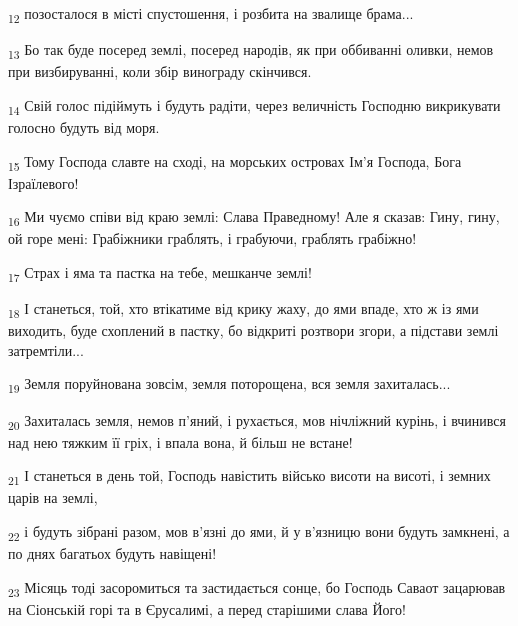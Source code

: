 \begin{tcolorbox}
\textsubscript{12} позосталося в місті спустошення, і розбита на звалище брама...
\end{tcolorbox}
\begin{tcolorbox}
\textsubscript{13} Бо так буде посеред землі, посеред народів, як при оббиванні оливки, немов при визбируванні, коли збір винограду скінчився.
\end{tcolorbox}
\begin{tcolorbox}
\textsubscript{14} Свій голос підіймуть і будуть радіти, через величність Господню викрикувати голосно будуть від моря.
\end{tcolorbox}
\begin{tcolorbox}
\textsubscript{15} Тому Господа славте на сході, на морських островах Ім'я Господа, Бога Ізраїлевого!
\end{tcolorbox}
\begin{tcolorbox}
\textsubscript{16} Ми чуємо співи від краю землі: Слава Праведному! Але я сказав: Гину, гину, ой горе мені: Грабіжники граблять, і грабуючи, граблять грабіжно!
\end{tcolorbox}
\begin{tcolorbox}
\textsubscript{17} Страх і яма та пастка на тебе, мешканче землі!
\end{tcolorbox}
\begin{tcolorbox}
\textsubscript{18} І станеться, той, хто втікатиме від крику жаху, до ями впаде, хто ж із ями виходить, буде схоплений в пастку, бо відкриті розтвори згори, а підстави землі затремтіли...
\end{tcolorbox}
\begin{tcolorbox}
\textsubscript{19} Земля поруйнована зовсім, земля поторощена, вся земля захиталась...
\end{tcolorbox}
\begin{tcolorbox}
\textsubscript{20} Захиталась земля, немов п'яний, і рухається, мов нічліжний курінь, і вчинився над нею тяжким її гріх, і впала вона, й більш не встане!
\end{tcolorbox}
\begin{tcolorbox}
\textsubscript{21} І станеться в день той, Господь навістить військо висоти на висоті, і земних царів на землі,
\end{tcolorbox}
\begin{tcolorbox}
\textsubscript{22} і будуть зібрані разом, мов в'язні до ями, й у в'язницю вони будуть замкнені, а по днях багатьох будуть навіщені!
\end{tcolorbox}
\begin{tcolorbox}
\textsubscript{23} Місяць тоді засоромиться та застидається сонце, бо Господь Саваот зацарював на Сіонській горі та в Єрусалимі, а перед старішими слава Його!
\end{tcolorbox}
